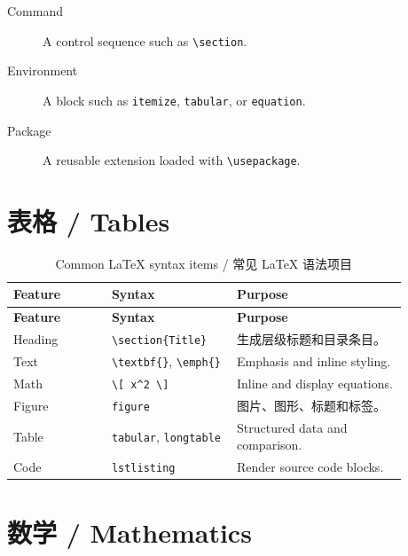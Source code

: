 \documentclass[11pt]{article}
\begin{document}
\begin{description}
  \item[Command] A control sequence such as \verb|\section|.
  \item[Environment] A block such as \verb|itemize|, \verb|tabular|, or \verb|equation|.
  \item[Package] A reusable extension loaded with \verb|\usepackage|.
\end{description}

\section{表格 / Tables}

\begin{longtable}{>{\raggedright\arraybackslash}p{0.22\linewidth}
                  >{\raggedright\arraybackslash}p{0.28\linewidth}
                  >{\raggedright\arraybackslash}p{0.38\linewidth}}
\caption{Common LaTeX syntax items / 常见 LaTeX 语法项目}
\label{tab:syntax}\\
\hline
\textbf{Feature} & \textbf{Syntax} & \textbf{Purpose} \\
\hline
\endfirsthead
\hline
\textbf{Feature} & \textbf{Syntax} & \textbf{Purpose} \\
\hline
\endhead
Heading & \verb|\section{Title}| & 生成层级标题和目录条目。 \\
Text & \verb|\textbf{}|, \verb|\emph{}| & Emphasis and inline styling. \\
Math & \verb|\[ x^2 \]| & Inline and display equations. \\
Figure & \verb|figure| & 图片、图形、标题和标签。 \\
Table & \verb|tabular|, \verb|longtable| & Structured data and comparison. \\
Code & \verb|lstlisting| & Render source code blocks. \\
\hline
\end{longtable}

\section{数学 / Mathematics}
\end{document}
